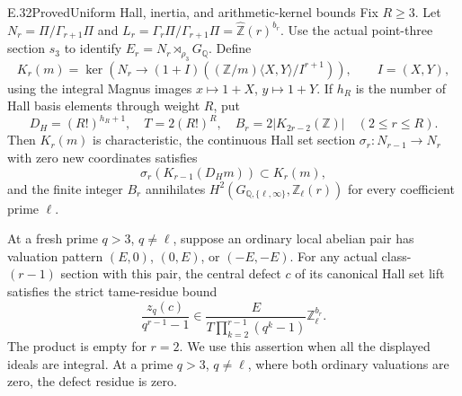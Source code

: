 \begin{result}{E.32}{Proved}{Uniform Hall, inertia, and arithmetic-kernel bounds}
\label{coh:fixed-depth-bounds}
Fix $R\ge3$.  Let $N_r=\Pi/\Gamma_{r+1}\Pi$ and
$L_r=\Gamma_r\Pi/\Gamma_{r+1}\Pi=\widehat{\mathbb Z}(r)^{b_r}$.
Use the actual point-three section $s_3$ to identify
$E_r=N_r\rtimes_{\rho_3}G_{\mathbb Q}$.  Define
\[
 K_r(m)=\ker\left(N_r\longrightarrow
 (1+I)((\mathbb Z/m)\langle X,Y\rangle/I^{r+1})\right),
 \qquad I=(X,Y),
 \tag{E.32.1}
\]
using the integral Magnus images $x\mapsto1+X$, $y\mapsto1+Y$.
If $h_R$ is the number of Hall basis elements through weight $R$, put
\[
 D_H=(R!)^{h_R+1},\quad T=2(R!)^R,\quad
 B_r=2|K_{2r-2}(\mathbb Z)|\quad(2\le r\le R).
 \tag{E.32.2}
\]
Then $K_r(m)$ is characteristic, the continuous Hall set section
$\sigma_r:N_{r-1}\to N_r$ with zero new coordinates satisfies
\[
 \sigma_r(K_{r-1}(D_Hm))\subset K_r(m),
 \tag{E.32.3}
\]
and the finite integer $B_r$ annihilates
$H^2(G_{\mathbb Q,\{\ell,\infty\}},\mathbb Z_\ell(r))$ for every
coefficient prime $\ell$.

At a fresh prime $q>3$, $q\ne\ell$, suppose an ordinary local
abelian pair has valuation pattern $(E,0)$, $(0,E)$, or $(-E,-E)$.
For any actual class-$(r-1)$ section with this pair, the central
defect $c$ of its canonical Hall set lift satisfies the strict
tame-residue bound
\[
 \frac{z_q(c)}{q^{r-1}-1} \in
 \frac{E}{T\prod_{k=2}^{r-1}(q^k-1)}
                      \mathbb Z_\ell^{b_r}.
 \tag{E.32.4}
\]
The product is empty for $r=2$.  We use this assertion when all the
displayed ideals are integral.  At a prime $q>3$, $q\ne\ell$,
where both ordinary valuations are zero, the defect residue is zero.
\end{result}
